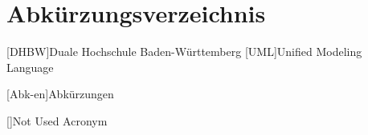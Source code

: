 %                                              
%

\chapter*{Abkürzungsverzeichnis} %

\begin{acronym}[12345678910]
	[DHBW]{Duale Hochschule Baden-Württemberg}
	[UML]{Unified Modeling Language}


	[Abk-en]{Abkürzungen}

	[]{Not Used Acronym}
	
\end{acronym}
